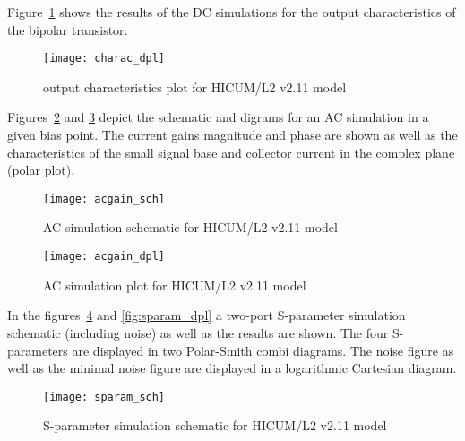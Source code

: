 Figure~\ref{fig:charac_dpl} shows the results of the DC simulations
for the output characteristics of the bipolar transistor.

\begin{figure}[ht]
\begin{center}
\texttt{[image: charac\_dpl]}
\end{center}
\caption{output characteristics plot for HICUM/L2 v2.11 model}
\label{fig:charac_dpl}
\end{figure}
\FloatBarrier


Figures~\ref{fig:acgain_sch} and \ref{fig:acgain_dpl} depict the
schematic and digrams for an AC simulation in a given bias point.  The
current gains magnitude and phase are shown as well as the
characteristics of the small signal base and collector current in the
complex plane (polar plot).

\begin{figure}[ht]
\begin{center}
\texttt{[image: acgain\_sch]}
\end{center}
\caption{AC simulation schematic for HICUM/L2 v2.11 model}
\label{fig:acgain_sch}
\end{figure}
\FloatBarrier

\begin{figure}[ht]
\begin{center}
\texttt{[image: acgain\_dpl]}
\end{center}
\caption{AC simulation plot for HICUM/L2 v2.11 model}
\label{fig:acgain_dpl}
\end{figure}
\FloatBarrier


In the figures~\ref{fig:sparam_sch} and \ref{fig:sparam_dpl} a
two-port S-parameter simulation schematic (including noise) as well as
the results are shown.  The four S-parameters are displayed in two
Polar-Smith combi diagrams.  The noise figure as well as the minimal
noise figure are displayed in a logarithmic Cartesian diagram.

\begin{figure}[ht]
\begin{center}
\texttt{[image: sparam\_sch]}
\end{center}
\caption{S-parameter simulation schematic for HICUM/L2 v2.11 model}
\label{fig:sparam_sch}
\end{figure}
\FloatBarrier

